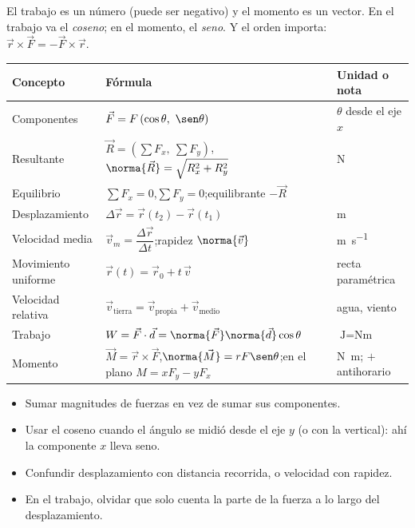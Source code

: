\documentclass[11pt,a4paper]{article}
\newcommand{\vF}{\vec{F}}\newcommand{\vr}{\vec{r}}\newcommand{\vd}{\vec{d}}\newcommand{\vR}{\vec{R}}
\newcommand{\vM}{\vec{M}}
\begin{document}
\begin{ojo}
El trabajo es un número (puede ser negativo) y el momento es un vector. En el trabajo va el \emph{coseno}; en el
momento, el \emph{seno}. Y el orden importa: $\vr\times\vF=-\vF\times\vr$.
\end{ojo}

\repaso
\begin{center}
\begin{tabularx}{\linewidth}{@{}l >{\raggedright\arraybackslash}p{72mm} L@{}}
\toprule
Concepto & Fórmula & Unidad o nota\\ \midrule
Componentes & $\vF=F\left(\cos\theta,\ \sen\theta\right)$ & $\theta$ desde el eje $x$\\
Resultante & $\vR=\left(\sum F_x,\ \sum F_y\right)$,\quad $\norma{\vR}=\sqrt{R_x^2+R_y^2}$ & \si{\newton}\\
Equilibrio & $\sum F_x=0$,\quad $\sum F_y=0$;\quad equilibrante $-\vR$ & \\
Desplazamiento & $\Delta\vr=\vr(t_2)-\vr(t_1)$ & \si{\metre}\\
Velocidad media & $\vec v_m=\dfrac{\Delta\vr}{\Delta t}$;\quad rapidez $\norma{\vec v}$ & \si{\metre\per\second}\\
Movimiento uniforme & $\vr(t)=\vr_0+t\,\vec v$ & recta paramétrica\\
Velocidad relativa & $\vec v_{\text{tierra}}=\vec v_{\text{propia}}+\vec v_{\text{medio}}$ & agua, viento\\
Trabajo & $W=\vF\cdot\vd=\norma{\vF}\norma{\vd}\cos\theta$ & $\si{\joule}=\si{\newton\metre}$\\
Momento & $\vM=\vr\times\vF$,\quad $\norma{\vM}=rF\sen\theta$;\quad en el plano $M=xF_y-yF_x$ & \si{\newton\metre}; $+$ antihorario\\
\bottomrule
\end{tabularx}
\end{center}

\begin{ojo}
\begin{itemize}
\item Sumar magnitudes de fuerzas en vez de sumar sus componentes.
\item Usar el coseno cuando el ángulo se midió desde el eje $y$ (o con la vertical): ahí la componente $x$ lleva seno.
\item Confundir desplazamiento con distancia recorrida, o velocidad con rapidez.
\item En el trabajo, olvidar que solo cuenta la parte de la fuerza a lo largo del desplazamiento.
\end{itemize}
\end{ojo}
\end{document}
